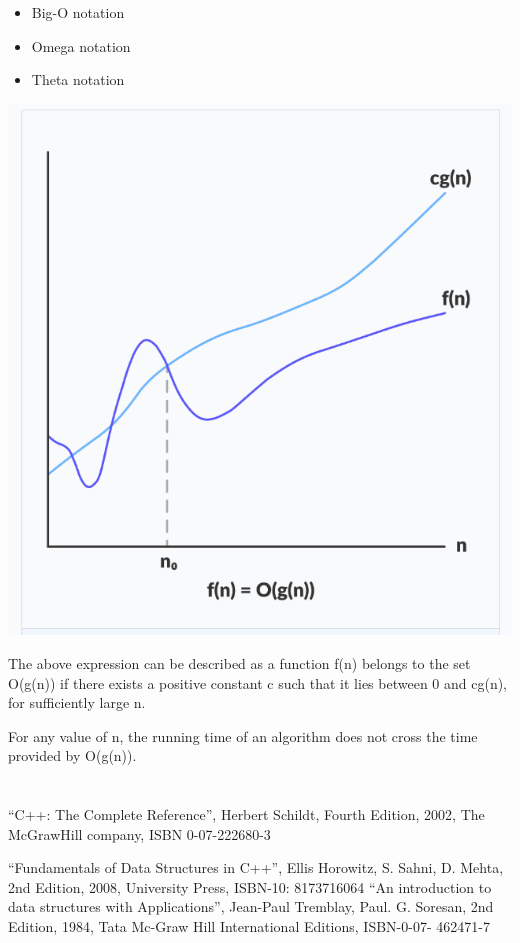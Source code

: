 \documentclass[conference]{IEEEtran}
\begin{document}
\begin{itemize}
\item Big-O notation
\item Omega notation
\item Theta notation
\end{itemize}
 \includegraphics[width=\linewidth]{1.png}
 
  \label{fig:DSA Complexity}
The above expression can be described as a function f(n) belongs to the set O(g(n)) if there exists a positive constant c such that it lies between 0 and cg(n), for sufficiently large n.

For any value of n, the running time of an algorithm does not cross the time provided by O(g(n)).


\section*{}


\begin{thebibliography} {}

 “C++: The Complete Reference”, Herbert Schildt, Fourth Edition, 2002, The McGrawHill company, ISBN 0-07-222680-3
\item “Fundamentals of Data Structures in C++”, Ellis Horowitz, S. Sahni, D. Mehta, 2nd
Edition, 2008, University Press, ISBN-10: 8173716064
“An introduction to data structures with Applications”, Jean-Paul Tremblay, Paul. G.
Soresan, 2nd Edition, 1984, Tata Mc-Graw Hill International Editions, ISBN-0-07-
462471-7


\end{thebibliography} 
\end{document}
